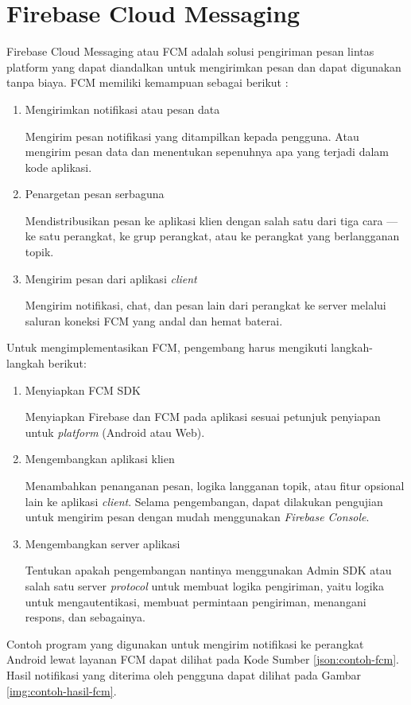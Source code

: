 \section{Firebase Cloud Messaging}
\par Firebase Cloud Messaging atau FCM adalah solusi pengiriman pesan lintas platform yang dapat diandalkan untuk mengirimkan pesan dan dapat digunakan tanpa biaya. FCM memiliki kemampuan sebagai berikut \cite{fcm-online}:
\begin{enumerate}
	\item Mengirimkan notifikasi atau pesan data
	\par Mengirim pesan notifikasi yang ditampilkan kepada pengguna. Atau mengirim pesan data dan menentukan sepenuhnya apa yang terjadi dalam kode aplikasi.
	\item Penargetan pesan serbaguna
	\par Mendistribusikan pesan ke aplikasi klien dengan salah satu dari tiga cara — ke satu perangkat, ke grup perangkat, atau ke perangkat yang berlangganan topik.
	\item Mengirim pesan dari aplikasi \textit{client}
	\par Mengirim notifikasi, chat, dan pesan lain dari perangkat ke server melalui saluran koneksi FCM yang andal dan hemat baterai.
\end{enumerate}
\par Untuk mengimplementasikan FCM, pengembang harus mengikuti langkah-langkah berikut:
\begin{enumerate}
	\item Menyiapkan FCM SDK
	\par Menyiapkan Firebase dan FCM pada aplikasi sesuai petunjuk penyiapan untuk \textit{platform} (Android atau Web).
	\item Mengembangkan aplikasi klien
	\par Menambahkan penanganan pesan, logika langganan topik, atau fitur opsional lain ke aplikasi \textit{client}. Selama pengembangan, dapat dilakukan pengujian untuk mengirim pesan dengan mudah menggunakan \textit{Firebase Console}.
	\item Mengembangkan server aplikasi
	\par Tentukan apakah pengembangan nantinya menggunakan Admin SDK atau salah satu server \textit{protocol} untuk membuat logika pengiriman, yaitu logika untuk mengautentikasi, membuat permintaan pengiriman, menangani respons, dan sebagainya.
\end{enumerate}
\par Contoh program yang digunakan untuk mengirim notifikasi ke perangkat Android lewat layanan FCM dapat dilihat pada Kode Sumber \ref{json:contoh-fcm}. Hasil notifikasi yang diterima oleh pengguna dapat dilihat pada Gambar \ref{img:contoh-hasil-fcm}.
